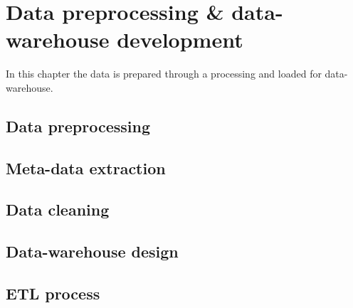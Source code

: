 \setlength{\footskip}{8mm}

\chapter{Data preprocessing \& data-warehouse development}
\label{ch:dpdd}

In this chapter the data is prepared through a processing and loaded for data-warehouse.

\section{Data preprocessing}

\section{Meta-data extraction}

\section{Data cleaning}

\section{Data-warehouse design}

\section{ETL process}


